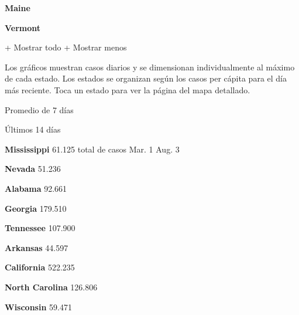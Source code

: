 \textbf{Maine}

\href{https://www.nytimes3xbfgragh.onion/interactive/2020/us/vermont-coronavirus-cases.html}{}

\textbf{Vermont}

+ Mostrar todo + Mostrar menos

Los gráficos muestran casos diarios y se dimensionan individualmente al
máximo de cada estado. Los estados se organizan según los casos per
cápita para el día más reciente. Toca un estado para ver la página del
mapa detallado.

\href{https://www.nytimes3xbfgragh.onion/interactive/2020/us/mississippi-coronavirus-cases.html}{}

Promedio de 7 días

Últimos 14 días

\textbf{Mississippi} 61.125 total de casos Mar. 1 Aug. 3

\href{https://www.nytimes3xbfgragh.onion/interactive/2020/us/nevada-coronavirus-cases.html}{}

\textbf{Nevada} 51.236

\href{https://www.nytimes3xbfgragh.onion/interactive/2020/us/alabama-coronavirus-cases.html}{}

\textbf{Alabama} 92.661

\href{https://www.nytimes3xbfgragh.onion/interactive/2020/us/georgia-coronavirus-cases.html}{}

\textbf{Georgia} 179.510

\href{https://www.nytimes3xbfgragh.onion/interactive/2020/us/tennessee-coronavirus-cases.html}{}

\textbf{Tennessee} 107.900

\href{https://www.nytimes3xbfgragh.onion/interactive/2020/us/arkansas-coronavirus-cases.html}{}

\textbf{Arkansas} 44.597

\href{https://www.nytimes3xbfgragh.onion/interactive/2020/us/california-coronavirus-cases.html}{}

\textbf{California} 522.235

\href{https://www.nytimes3xbfgragh.onion/interactive/2020/us/north-carolina-coronavirus-cases.html}{}

\textbf{North Carolina} 126.806

\href{https://www.nytimes3xbfgragh.onion/interactive/2020/us/wisconsin-coronavirus-cases.html}{}

\textbf{Wisconsin} 59.471

\href{https://www.nytimes3xbfgragh.onion/interactive/2020/us/iowa-coronavirus-cases.html}{}

